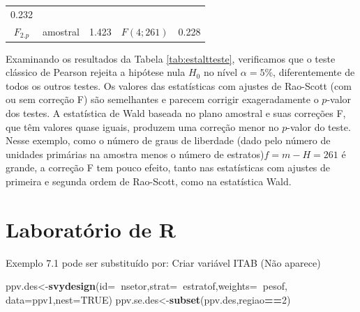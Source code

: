 \documentclass[]{book}
\newenvironment{Shaded}{\begin{snugshade}}{\end{snugshade}}
\newcommand{\KeywordTok}[1]{\textcolor[rgb]{0.13,0.29,0.53}{\textbf{#1}}}
\newcommand{\DataTypeTok}[1]{\textcolor[rgb]{0.13,0.29,0.53}{#1}}
\newcommand{\DecValTok}[1]{\textcolor[rgb]{0.00,0.00,0.81}{#1}}
\newcommand{\OtherTok}[1]{\textcolor[rgb]{0.56,0.35,0.01}{#1}}
\newcommand{\OperatorTok}[1]{\textcolor[rgb]{0.81,0.36,0.00}{\textbf{#1}}}
\newcommand{\NormalTok}[1]{#1}
\theoremstyle{definition}
\theoremstyle{definition}
\theoremstyle{definition}
\theoremstyle{remark}
\begin{document}
\begin{longtable}[]{@{}cclcr@{}}
\begin{minipage}[t]{0.07\columnwidth}
0.232\strut
\end{minipage}\tabularnewline
\begin{minipage}[t]{0.40\columnwidth}\centering\strut
\(F_{2.p}\)\strut
\end{minipage} & \begin{minipage}[t]{0.15\columnwidth}\centering\strut
amostral\strut
\end{minipage} & \begin{minipage}[t]{0.05\columnwidth}\raggedright\strut
1.423\strut
\end{minipage} & \begin{minipage}[t]{0.19\columnwidth}\centering\strut
\(F\left( 4;261\right)\)\strut
\end{minipage} & \begin{minipage}[t]{0.07\columnwidth}\raggedleft\strut
0.228\strut
\end{minipage}\tabularnewline
\bottomrule
\end{longtable}

Examinando os resultados da Tabela \ref{tab:estaltteste}, verificamos
que o teste clássico de Pearson rejeita a hipótese nula \(H_{0}\) no
nível \(\alpha =5\%\), diferentemente de todos os outros testes. Os
valores das estatísticas com ajustes de Rao-Scott (com ou sem correção
F) são semelhantes e parecem corrigir exageradamente o \(p\)-valor dos
testes. A estatística de Wald baseada no plano amostral e suas correções
F, que têm valores quase iguais, produzem uma correção menor no
\(p\)-valor do teste. Nesse exemplo, como o número de graus de liberdade
(dado pelo número de unidades primárias na amostra menos o número de
estratos)\(f=m-H=261\) é grande, a correção F tem pouco efeito, tanto
nas estatísticas com ajustes de primeira e segunda ordem de Rao-Scott,
como na estatística Wald.

\section{Laboratório de R}\label{laboratorio-de-r-4}

Exemplo 7.1 pode ser substituído por: Criar variável ITAB (Não aparece)

\begin{Shaded}
\begin{Highlighting}[]
\NormalTok{ppv.des<-}\KeywordTok{svydesign}\NormalTok{(}\DataTypeTok{id=}\OperatorTok{~}\NormalTok{nsetor,}\DataTypeTok{strat=}\OperatorTok{~}\NormalTok{estratof,}\DataTypeTok{weights=}\OperatorTok{~}\NormalTok{pesof,}
\DataTypeTok{data=}\NormalTok{ppv1,}\DataTypeTok{nest=}\OtherTok{TRUE}\NormalTok{)}
\NormalTok{ppv.se.des<-}\KeywordTok{subset}\NormalTok{(ppv.des,regiao}\OperatorTok{==}\DecValTok{2}\NormalTok{)}
\end{Highlighting}
\end{Shaded}
\end{document}
